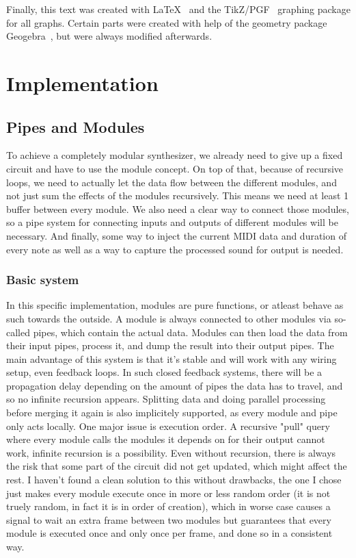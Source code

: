 \documentclass[11pt,a4paper]{article}
\begin{document}
Finally, this text was created with LaTeX~\cite{Latex} and the TikZ/PGF~\cite{Tikz} graphing package for all graphs. Certain parts were created with help of the geometry package Geogebra~\cite{Geogebra}, but were always modified afterwards.

\clearpage

\section{Implementation}

\subsection{Pipes and Modules}

To achieve a completely modular synthesizer, we already need to give up a fixed circuit and have to use the module concept. On top of that, because of recursive loops, we need to actually let the data flow between the different modules, and not just sum the effects of the modules recursively. This means we need at least 1 buffer between every module. We also need a clear way to connect those modules, so a pipe system for connecting inputs and outputs of different modules will be necessary. And finally, some way to inject the current MIDI data and duration of every note as well as a way to capture the processed sound for output is needed.

\subsubsection{Basic system}

In this specific implementation, modules are pure functions, or atleast behave as such towards the outside. A module is always connected to other modules via so-called pipes, which contain the actual data. Modules can then load the data from their input pipes, process it, and dump the result into their output pipes. The main advantage of this system is that it's stable and will work with any wiring setup, even feedback loops. In such closed feedback systems, there will be a propagation delay depending on the amount of pipes the data has to travel, and so no infinite recursion appears. Splitting data and doing parallel processing before merging it again is also implicitely supported, as every module and pipe only acts locally.
One major issue is execution order. A recursive "pull" query where every module calls the modules it depends on for their output cannot work, infinite recursion is a possibility. Even without recursion, there is always the risk that some part of the circuit did not get updated, which might affect the rest. I haven't found a clean solution to this without drawbacks, the one I chose just makes every module execute once in more or less random order (it is not truely random, in fact it is in order of creation), which in worse case causes a signal to wait an extra frame between two modules but guarantees that every module is executed once and only once per frame, and done so in a consistent way.
\end{document}
